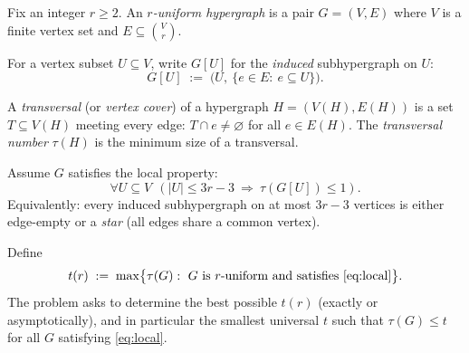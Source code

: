 Fix an integer $r\ge 2$. An \emph{$r$-uniform hypergraph} is a pair $G=(V,E)$ where $V$ is a finite vertex set and $E\subseteq \binom{V}{r}$.

For a vertex subset $U\subseteq V$, write $G[U]$ for the \emph{induced} subhypergraph on $U$:
\[
G[U] \;:=\; \bigl(U,\ \{e\in E:\ e\subseteq U\}\bigr).
\]

A \emph{transversal} (or \emph{vertex cover}) of a hypergraph $H=(V(H),E(H))$ is a set $T\subseteq V(H)$ meeting every edge: $T\cap e\neq\varnothing$ for all $e\in E(H)$. The \emph{transversal number} $\tau(H)$ is the minimum size of a transversal.

Assume $G$ satisfies the local property:
\begin{equation}
\label{eq:local}
\forall U\subseteq V\ \ (|U|\le 3r-3\ \Rightarrow\ \tau(G[U])\le 1).
\end{equation}
Equivalently: every induced subhypergraph on at most $3r-3$ vertices is either edge-empty or a \emph{star} (all edges share a common vertex).

Define
\[
 t(r)\;:=\; \max\bigl\{\tau(G):\ G\ \text{is $r$-uniform and satisfies \eqref{eq:local}}\bigr\}.
\]
The problem asks to determine the best possible $t(r)$ (exactly or asymptotically), and in particular the smallest universal $t$ such that $\tau(G)\le t$ for all $G$ satisfying \eqref{eq:local}.
